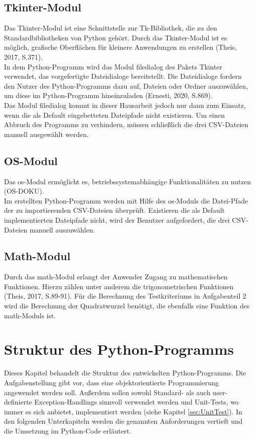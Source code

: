 \documentclass[11pt,a4paper]{scrreprt}
\begin{document}
\section{Tkinter-Modul}
Das Tkinter-Modul ist eine Schnittstelle zur Tk-Bibliothek, die zu den Standardbibliotheken von Python gehört. Durch das Tkinter-Modul ist es möglich, grafische Oberflächen für kleinere Anwendungen zu erstellen (Theis, 2017, S.371). \\
In dem Python-Programm wird das Modul filedialog des Pakets Tkinter verwendet, das vorgefertigte Dateidialoge bereitstellt. Die Dateidialoge fordern den Nutzer des Python-Programms dazu auf, Dateien oder Ordner auszuwählen, um diese im Python-Programm hineinzuladen (Ernesti, 2020, S.869).\\
Das Modul filedialog kommt in dieser Hausarbeit jedoch nur dann zum Einsatz, wenn die als Default eingebetteten Dateipfade nicht existieren. Um einen Abbruch des Programms zu verhindern, müssen schließlich die drei CSV-Dateien manuell ausgewählt werden. 


\section{OS-Modul}
Das os-Modul ermöglicht es, betriebssystemabhängige Funktionalitäten zu nutzen (OS-DOKU).\\ Im erstellten Python-Programm werden mit Hilfe des os-Moduls die Datei-Pfade der zu importierenden CSV-Dateien überprüft. Existieren die als Default implementierten Dateipfade nicht, wird der Benutzer aufgefordert, die drei CSV-Dateien manuell auszuwählen. 

\section{Math-Modul}
Durch das math-Modul erlangt der Anwender Zugang zu mathematischen Funktionen. Hierzu zählen unter anderem die trigonometrischen Funktionen (Theis, 2017, S.89-91). Für die Berechnung des Testkriteriums in Aufgabenteil 2 wird die Berechnung der Quadratwurzel benötigt, die ebenfalls eine Funktion des math-Moduls ist. 
\chapter{Struktur des Python-Programms}

Dieses Kapitel behandelt die Struktur des entwickelten Python-Programms. Die Aufgabenstellung gibt vor, dass eine objektorientierte Programmierung angewendet werden soll. Außerdem sollen sowohl Standard- als auch user-definierte Exception-Handlings sinnvoll verwendet werden und Unit-Tests, wo immer es sich anbietet, implementiert werden (siehe Kapitel \ref{sec:UnitTest}). In den folgenden Unterkapiteln werden die genannten Anforderungen vertieft und die Umsetzung im Python-Code erläutert. 
\end{document}
